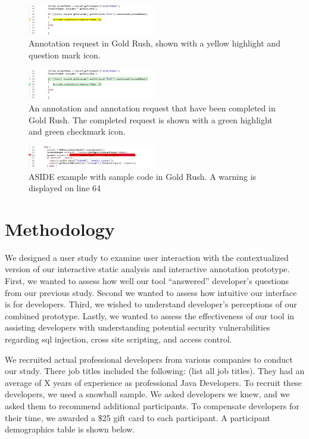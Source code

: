 \documentclass[twoside,letterpaper]{soups}
\begin{document}
\begin{figure}[h]
\centering
\includegraphics[width=0.5\textwidth]{annotationRequest}
\caption{Annotation request in Gold Rush, shown with a yellow highlight and question mark icon.}
\label{fig:annotationRequest}
\end{figure}

\begin{figure}[h]
\centering
\includegraphics[width=0.5\textwidth]{completedRequest}
\caption{An annotation and annotation request that have been completed in Gold Rush. The completed request is shown with a green highlight and green checkmark icon.}
\label{fig:completedRequest}
\end{figure}

\begin{figure}
\centering
\includegraphics[width=0.5\textwidth]{warning}
\caption{ASIDE example with sample code in Gold Rush. A warning is displayed on line 64}
\label{fig:warning}
\end{figure}



\section{Methodology}
We designed a user study to examine user interaction with the contextualized version of our interactive static analysis and interactive annotation prototype. First, we wanted to assess how well our tool ``answered'' developer's questions from our previous study. Second we wanted to assess how intuitive our interface is for developers. Third, we wished to understand developer's perceptions of our combined prototype. Lastly, we wanted to assess the effectiveness of our tool in assisting developers with understanding potential security vulnerabilities regarding sql injection, cross site scripting, and access control.

We recruited actual professional developers from various companies to conduct our study. There job titles included the following: (list all job titles).  They had an average of X years of experience as professional Java Developers. To recruit these developers, we used a snowball sample. We asked developers we knew, and we asked them to recommend additional participants. To compensate developers for their time, we awarded a  \$25 gift card to each participant. A participant demographics table is shown below.
\end{document}
